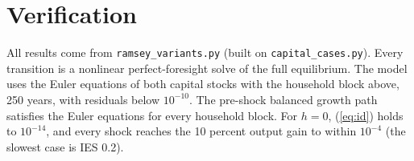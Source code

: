 \documentclass[11pt]{article}
\begin{document}
\appendix
\section{Verification}
All results come from \texttt{ramsey\_variants.py} (built on \texttt{capital\_cases.py}). Every transition is a nonlinear
perfect-foresight solve of the full equilibrium. The model uses the Euler equations of both capital stocks with
the household block above, 250 years, with residuals below $10^{-10}$. The pre-shock balanced growth path satisfies
the Euler equations for every household block. For $h=0$, (\ref{eq:id}) holds to $10^{-14}$, and every shock reaches the 10 percent output gain to within $10^{-4}$ (the slowest case is IES 0.2).

\begin{table}[h]\centering\scriptsize

\end{table}
\end{document}
